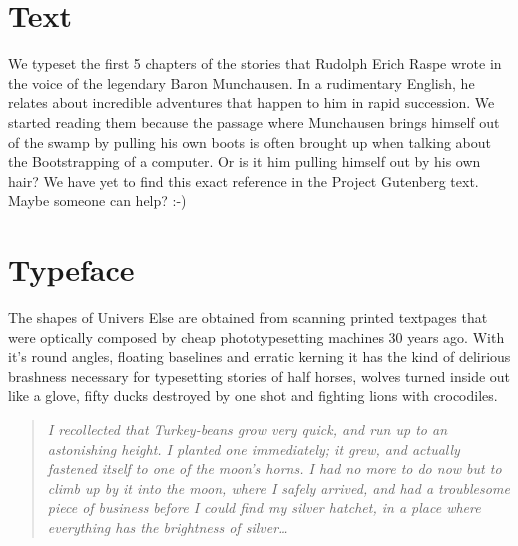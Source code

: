 \section*{Text}
We typeset the first 5 chapters of the stories that Rudolph Erich Raspe wrote
in the voice of the legendary Baron Munchausen. In a rudimentary English, he
relates about incredible adventures that happen to him in rapid succession. We
started reading them because the passage where Munchausen brings himself out
of the swamp by pulling his own boots is often brought up when talking about
the Bootstrapping of a computer. Or is it him pulling himself out by his own
hair? We have yet to find this exact reference in the Project Gutenberg text.
Maybe someone can help? :-)

\section*{Typeface}
The shapes of Univers Else are obtained from scanning printed textpages that
were optically composed by cheap phototypesetting machines 30 years ago.  With
it's round angles, floating baselines and erratic kerning it has the kind of
delirious brashness necessary for typesetting stories of half horses, wolves
turned inside out like a glove, fifty ducks destroyed by one shot and fighting
lions with crocodiles.

\begin{quote}
\textit{I recollected that Turkey-beans grow very quick, and run up to an
astonishing height. I planted one immediately; it grew, and actually fastened
itself to one of the moon's horns. I had no more to do now but to climb up by
it into the moon, where I safely arrived, and had a troublesome piece of
business before I could find my silver hatchet, in a place where everything
has the brightness of silver\dots}
\end{quote}
